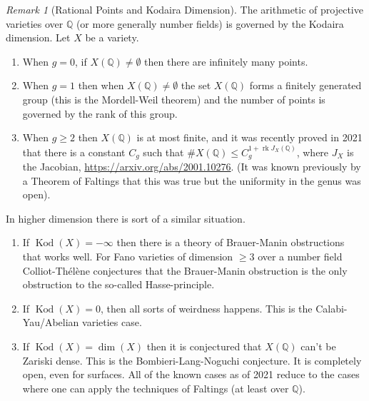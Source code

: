 \documentclass[12pt]{article}
\numberwithin{equation}{section}
\theoremstyle{definition}
\theoremstyle{remark}
\newtheorem{remark}[theorem]{Remark}
\newcommand{\QQ}{\mathbb{Q}}
\newcommand{\rk}{\operatorname{rk}}
\newcommand{\kod}{\operatorname{Kod}}
\begin{document}
\begin{remark}[Rational Points and Kodaira Dimension]
	The arithmetic of projective varieties over $\QQ$ (or more generally number fields) is governed by the Kodaira dimension.
	Let $X$ be a variety.  
	\begin{enumerate}
		\item When $g=0$, if $X(\QQ)\neq \emptyset$ then there are infinitely many points. 
		\item When $g=1$ then when $X(\QQ)\neq \emptyset$ the set $X(\QQ)$ forms a finitely generated group (this is the Mordell-Weil theorem) and the number of points is governed by the rank of this group. 
		\item When $g\geq 2$ then $X(\QQ)$ is at most finite, and it was recently proved in 2021 that there is a constant $C_g$ such that $\#X(\QQ)\leq C_g^{1+\rk J_X(\QQ)}$, where $J_X$ is the Jacobian, \url{https://arxiv.org/abs/2001.10276}. (It was known previously by a Theorem of Faltings that this was true but the uniformity in the genus was open).
	\end{enumerate}
In higher dimension there is sort of a similar situation. 
\begin{enumerate}
	\item If $\kod(X)=-\infty$ then there is a theory of Brauer-Manin obstructions that works well. For Fano varieties of dimension $\geq 3$ over a number field Colliot-Th\'{e}l\`{e}ne conjectures that the Brauer-Manin obstruction is the only obstruction to the so-called Hasse-principle.
	\item If $\kod(X)=0$, then all sorts of weirdness happens. 
	This is the Calabi-Yau/Abelian varieties case. 
	\item If $\kod(X)=\dim(X)$ then it is conjectured that $X(\QQ)$ can't be Zariski dense. 
	This is the Bombieri-Lang-Noguchi conjecture. 
	It is completely open, even for surfaces. 
	All of the known cases as of 2021 reduce to the cases where one can apply the techniques of Faltings (at least over $\QQ$). 
\end{enumerate}
\end{remark}
\end{document}
